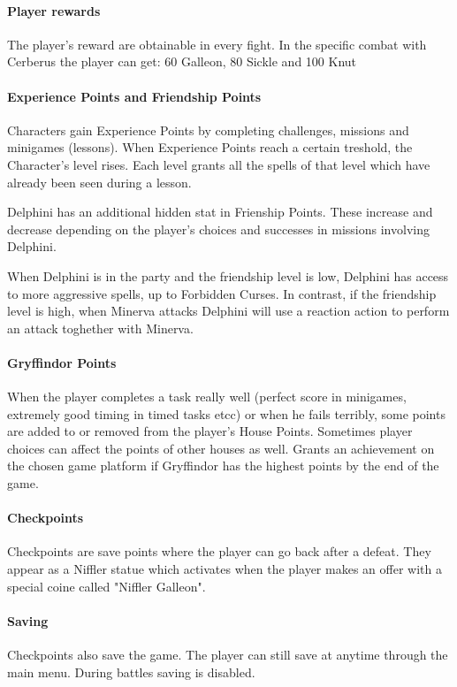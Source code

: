 \pagebreak

\paragraph{Player rewards}

The player's reward are obtainable in every fight. In the specific combat with Cerberus the player can get: 60 Galleon, 80 Sickle and 100 Knut


\paragraph{Experience Points and Friendship Points}

Characters gain Experience Points by completing challenges, missions and minigames (lessons). When Experience Points reach a certain treshold, the Character's level rises. 
Each level grants all the spells of that level which have already been seen during a lesson.

Delphini has an additional hidden stat in Frienship Points. These increase and decrease depending on the player's choices and successes in missions involving Delphini.

When Delphini is in the party and the friendship level is low, Delphini has access to more aggressive spells, up to Forbidden Curses. 
In contrast, if the friendship level is high, when Minerva attacks Delphini will use a reaction action to perform an attack toghether with Minerva.


\paragraph{Gryffindor Points}

When the player completes a task really well (perfect score in minigames, extremely good timing in timed tasks etcc) or when he fails terribly, some points are added to or removed from the player's House Points. Sometimes player choices can affect the points of other houses as well.
Grants an achievement on the chosen game platform if Gryffindor has the highest points by the end of the game.

\pagebreak 

\paragraph{Checkpoints}

Checkpoints are save points where the player can go back after a defeat. They appear as a Niffler statue which activates when the player makes an offer with a special coine called "Niffler Galleon".

\paragraph{Saving}

Checkpoints also save the game. The player can still save at anytime through the main menu. During battles saving is disabled.
\pagebreak